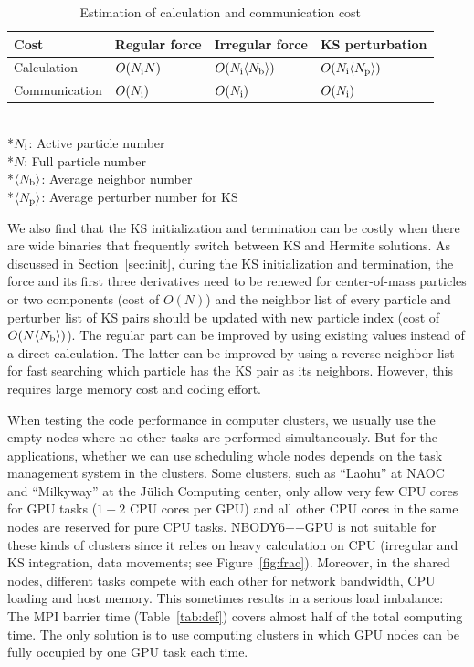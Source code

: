 \documentclass[usenatbib,aas_macros]{mn2e}
\def\nbodyppgpu{NBODY6++GPU }
\begin{document}
\begin{table}
  \caption{Estimation of calculation and communication cost}
  \label{tab:cost}
  \begin{tabular}{llll}
    \hline
    Cost          & Regular force   & Irregular force             & KS perturbation \\\hline
    Calculation   & $O(N_{\rm i} N)$  & $O(N_{\rm i} \langle N_{\rm b} \rangle)$ & $O(N_{\rm i} \langle N_{\rm p} \rangle)$ \\
    Communication & $O(N_{\rm i})$        & $O(N_{\rm i})$                     & $O(N_{\rm i})$ \\\hline
  \end{tabular}\\
  *$N_{\rm i}$: Active particle number \\
  *$N$: Full particle number \\
  *$\langle N_{\rm b} \rangle$: Average neighbor number \\
  *$\langle N_{\rm p} \rangle$: Average perturber number for KS \\
\end{table}

We also find that the KS initialization and termination can be costly when there are wide binaries that frequently switch between KS and Hermite solutions.
As discussed in Section~\ref{sec:init}, during the KS initialization and termination, the force and its first three derivatives need to be renewed for center-of-mass particles or two components (cost of $O(N)$) 
and the neighbor list of every particle and perturber list of KS pairs should be updated with new particle index (cost of $O(N \langle N_{\rm b} \rangle)$). 
The regular part can be improved by using existing values instead of a direct calculation. The latter can be improved by using a reverse neighbor list for fast searching which particle has the KS pair as its neighbors. 
However, this requires large memory cost and coding effort.

When testing the code performance in computer clusters, we usually use the empty nodes where no other tasks are performed simultaneously. 
But for the applications, whether we can use scheduling whole nodes depends on the task management system in the clusters. 
Some clusters, such as ``Laohu'' at NAOC and ``Milkyway'' at the J\"ulich Computing center, only allow very few CPU cores for GPU tasks ($1-2$ CPU cores per GPU) and all other CPU cores in the same nodes are reserved for pure CPU tasks. 
\nbodyppgpu is not suitable for these kinds of clusters since it relies on heavy calculation on CPU (irregular and KS integration, data movements; see Figure~\ref{fig:frac}). 
Moreover, in the shared nodes, different tasks compete with each other for network bandwidth, CPU loading and host memory. 
This sometimes results in a serious load imbalance: 
The MPI barrier time (Table~\ref{tab:def}) covers almost half of the total computing time. 
The only solution is to use computing clusters in which GPU nodes can be fully occupied by one GPU task each time.
\end{document}
